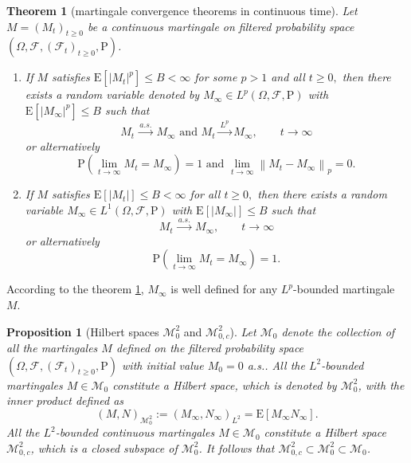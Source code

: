\documentclass{report}
\newtheorem{proposition}{Proposition}[section]
\newtheorem{theorem}{Theorem}[section]
\theoremstyle{nonumberplain}
\begin{document}
\begin{theorem}[martingale convergence theorems in continuous time]\label{martingale convergence}
Let $M=(M_{t})_{t\ge0}$ be a continuous martingale on filtered probability space $(\Omega,\mathcal{F},(\mathcal{F}_{t})_{t\ge0},\mathrm{P})$.
\begin{enumerate}
	\item If $M$ satisfies $\mathrm{E}\left[\left|M_{t}\right|^{p}\right] \leq B<\infty$ for some $p>1$ and all $t \geq 0,$ then there exists a random variable denoted by $M_{\infty}\in L^p(\Omega,\mathcal{F},\mathrm{P})$ with $\mathrm{E}\left[\left|M_{\infty}\right|^p\right] \leq B$ such that
	\[
	M_t\stackrel{\ a.s.\ }{\longrightarrow}M_{\infty}\text { and }M_t\stackrel{\ L^p\ }{\longrightarrow}M_{\infty},\qquad t\longrightarrow\infty
	\]
	or alternatively
	\[
	\mathrm{P}\left(\lim _{t \rightarrow \infty} M_{t}=M_{\infty}\right)=1 \text { and } \lim _{t \rightarrow \infty}\left\|M_{t}-M_{\infty}\right\|_{p}=0.
	\]
	\item If $M$ satisfies $\mathrm{E}\left[\left|M_{t}\right|\right]\le B<\infty$ for all $t \ge 0,$ then there exists a random variable $M_{\infty}\in L^1(\Omega,\mathcal{F},\mathrm{P})$ with $\mathrm{E}\left[\left|M_{\infty}\right|\right] \leq B$ such that
	\[
	M_t\stackrel{\ a.s.\ }{\longrightarrow}M_{\infty},\qquad t\longrightarrow\infty
	\]
	or alternatively
	\[
	\mathrm{P}\left(\lim _{t \rightarrow \infty} M_{t}=M_{\infty}\right)=1.
	\]
\end{enumerate} 
\end{theorem}

According to the theorem \ref{martingale convergence}, $M_{\infty}$ is well defined for any $L^p$-bounded martingale $M$. 

\begin{proposition}[Hilbert spaces $\mathscr{M}^2_0$ and $\mathscr{M}^2_{0,c}$]
Let $\mathscr{M}_0$ denote the collection of all the martingales $M$ defined on the filtered probability space $(\Omega,\mathcal{F},(\mathcal{F}_{t})_{t\ge0},\mathrm{P})$ with initial value $M_0=0$ a.s.. All the $L^2$-bounded martingales $M\in\mathscr{M}_0$ constitute a Hilbert space, which is denoted by $\mathscr{M}^2_{0}$, with the inner product defined as 
$$
 (M, N)_{\mathscr{M}^2_{0}}:=\left( M_{\infty}, N_{\infty}\right)_{L^{2}}=\mathrm{E}\left[M_{\infty} N_{\infty}\right].
$$
All the $L^2$-bounded continuous martingales $M\in\mathscr{M}_0$ constitute a Hilbert space $\mathscr{M}^2_{0,c}$, which is a closed subspace of $\mathscr{M}^2_{0}$. It follows that $\mathscr{M}^2_{0,c}\subset\mathscr{M}^2_{0}\subset\mathscr{M}_{0}$.
\end{proposition}
\end{document}
